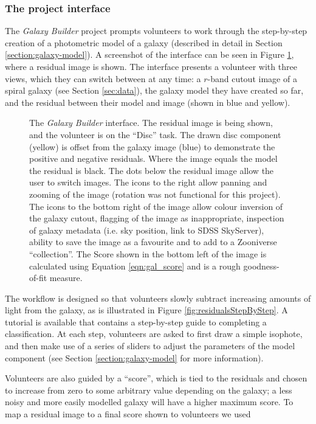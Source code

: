 \documentclass[trackchanges]{aastex63}
\begin{document}
\subsubsection{The project interface}

The \textit{Galaxy Builder} project prompts volunteers to work through the step-by-step creation of a photometric model of a galaxy (described in detail in Section \ref{section:galaxy-model}). A screenshot of the interface can be seen in Figure \ref{fig:interfaceInProgress}, where a residual image is shown. The interface presents a volunteer with three views, which they can switch between at any time: a $r$-band cutout image of a spiral galaxy (see Section \ref{sec:data}), the galaxy model they have created so far, and the residual between their model and image (shown in blue and yellow).

\begin{figure}
  \caption{The \textit{Galaxy Builder} interface. The residual image is being shown, and the volunteer is on the ``Disc'' task. The drawn disc component (yellow) is offset from the galaxy image (blue) to demonstrate the positive and negative residuals. Where the image equals the model the residual is black. The dots below the residual image allow the user to switch images. The icons to the right allow panning and zooming of the image (rotation was not functional for this project). The icons to the bottom right of the image allow colour inversion of the galaxy cutout, flagging of the image as inappropriate, inspection of galaxy metadata (i.e. sky position, link to SDSS SkyServer), ability to save the image as a favourite and to add to a Zooniverse ``collection''. The Score shown in the bottom left of the image is calculated using Equation \ref{eqn:gal_score} and is a rough goodness-of-fit measure.}
  \label{fig:interfaceInProgress}
\end{figure}


The workflow is designed so that volunteers slowly subtract increasing amounts of light from the galaxy, as is illustrated in Figure \ref{fig:residualsStepByStep}. A tutorial is available that contains a step-by-step guide to completing a classification. At each step, volunteers are asked to first draw a simple isophote, and then make use of a series of sliders to adjust the parameters of the model component (see Section \ref{section:galaxy-model} for more information).

Volunteers are also guided by a ``score'', which is tied to the residuals and chosen to increase from zero to some arbitrary value depending on the galaxy; a less noisy and more easily modelled galaxy will have a higher maximum score. To map a residual image to a final score shown to volunteers we used
\end{document}
